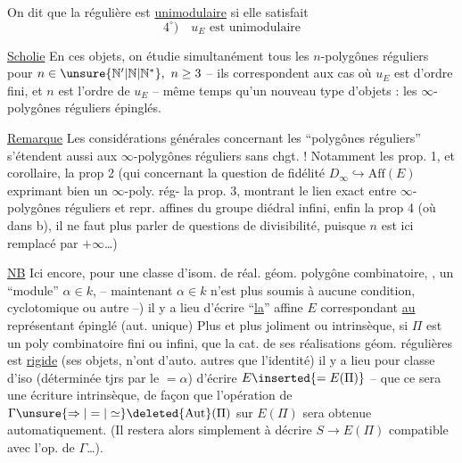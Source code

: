 

On dit que la  régulière est \uline{unimodulaire} si elle satisfait
\[
4^\circ)\quad u_E \text{ est unimodulaire}
\]

\uline{Scholie} En  ces objets, on étudie simultanément tous les $n$-polygônes réguliers  pour $n\in\unsure{\mathbb N'|\mathbb N|\mathbb N^{*}},\ n\geq 3$ -- ils correspondent aux cas où $u_E$ est d'ordre fini, et $n$ est l'ordre de $u_E$ --  même temps qu'un nouveau type d'objets : les $\infty$-polygônes réguliers épinglés.

\uline{Remarque} Les considérations générales concernant les ``polygônes réguliers'' s'étendent aussi aux $\infty$-polygônes réguliers sans chgt. ! Notamment les prop. 1, et corollaire, la prop 2 (qui  concernant la  question de fidélité $D_\infty\hookrightarrow\mathrm{Aff}(E)$ exprimant    bien un $\infty$-poly. rég-
la prop. 3,  montrant le lien exact entre $\infty$-polygônes réguliers et repr. affines du groupe diédral infini, enfin la prop 4 (où dans b),  il ne faut plus parler de questions de divisibilité, puisque $n$ est ici remplacé par $+\infty$\ldots)

\uline{NB} Ici encore, pour une classe d'isom. de réal. géom.   polygône combinatoire, ,   un ``module'' $\alpha\in k$, -- maintenant $\alpha\in k$ n'est plus soumis à aucune condition, cyclotomique ou autre --) il y a lieu d'écrire ``\uline{la}''  affine $E$ correspondant \uline{au} représentant épinglé (aut. unique) Plus  et plus joliment ou intrinsèque, si $\Pi$ est un poly combinatoire fini ou infini,  que la cat. de ses réalisations géom. régulières est \uline{rigide} (ses objets, n'ont d'auto. autres que l'identité) il y a lieu pour  classe d'iso (déterminée tjrs par le $=\alpha$) d'écrire $E\inserted{=E(\Pi)}$ --  que ce sera une
écriture intrinsèque, de façon que l'opération de $\Gamma\unsure{\Rightarrow|=|\simeq}\deleted{\operatorname{Aut}}(\Pi)$ sur $E(\Pi)$ sera obtenue automatiquement. (Il restera alors simplement à décrire $S\longrightarrow E(\Pi)$ compatible avec l'op. de $\Gamma$\ldots).

